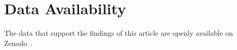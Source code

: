\section*{Data Availability}
The data that support the findings of this article are openly available on Zenodo~\cite{pinetti_2025_17704724}.

\medskip

